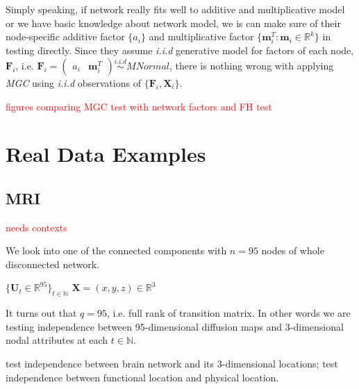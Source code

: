 \documentclass[12pt]{article}
\theoremstyle{definition}
\begin{document}
Simply speaking, if network really fits well to additive and multiplicative model or we have basic knowledge about network model, we is can make sure of their node-specific additive factor $\{ a_{i} \}$ and multiplicative factor $\{ \mathbf{m}^{T}_{i} : \mathbf{m}_{i} \in \mathbb{R}^{k} \}$ in testing directly. Since they assume \textit{i.i.d} generative model for factors of each node, $\mathbf{F}_{i}$, i.e. $\mathbf{F}_{i} = \begin{pmatrix} a_{i} & \mathbf{m}^{T}_{i} \end{pmatrix} \overset{i.i.d}{\sim} MNormal$, there is nothing wrong with applying \textit{MGC} using \textit{i.i.d} observations of $\{ \mathbf{F}_{i}, \mathbf{X}_{i} \}$.   
	
\textcolor{red}{figures comparing MGC test with network factors and FH test}	
	
	
	
\section{Real Data Examples}
\label{sec:real}
	
\subsection{MRI}
	
\textcolor{red}{needs contexts}	
	
We look into one of the connected components with $n = 95$ nodes of whole disconnected network. 
	
$\{ \mathbf{U}_{t} \in \mathbb{R}^{95} \}_{t \in \mathbb{N}}$ $\mathbf{X} = (x,y,z) \in \mathbb{R}^{3}$
	
It turns out that $q=95$, i.e. full rank of transition matrix. In other words we are testing independence between 95-dimensional diffusion maps and 3-dimensional nodal attributes at each $t \in \mathbb{N}$.
	
	
test independence between brain network and its 3-dimensional locations; test independence between functional location and physical location. 
	
\end{document}

